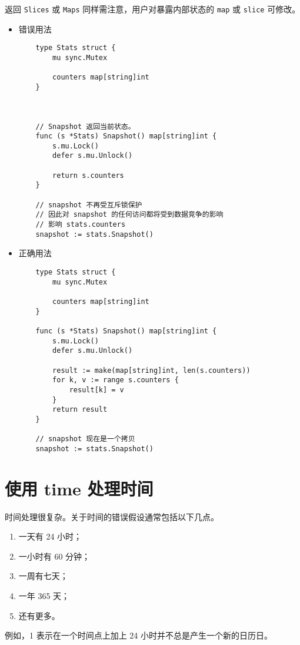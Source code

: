 返回 \texttt{Slices} 或 \texttt{Maps} 同样需注意，用户对暴露内部状态的 \texttt{map} 或 \texttt{slice} 可修改。
\begin{itemize}[leftmargin=4em]
\item 错误用法

  \begin{verbatim}
    type Stats struct {
    	mu sync.Mutex

    	counters map[string]int
    }



    // Snapshot 返回当前状态。
    func (s *Stats) Snapshot() map[string]int {
    	s.mu.Lock()
    	defer s.mu.Unlock()

    	return s.counters
    }

    // snapshot 不再受互斥锁保护
    // 因此对 snapshot 的任何访问都将受到数据竞争的影响
    // 影响 stats.counters
    snapshot := stats.Snapshot()
  \end{verbatim}
\item 正确用法

  \begin{verbatim}
    type Stats struct {
    	mu sync.Mutex

    	counters map[string]int
    }

    func (s *Stats) Snapshot() map[string]int {
    	s.mu.Lock()
    	defer s.mu.Unlock()

    	result := make(map[string]int, len(s.counters))
    	for k, v := range s.counters {
    		result[k] = v
    	}
    	return result
    }

    // snapshot 现在是一个拷贝
    snapshot := stats.Snapshot()
  \end{verbatim}
\end{itemize}

\section{使用 time 处理时间}
时间处理很复杂。关于时间的错误假设通常包括以下几点。
\begin{enumerate}[leftmargin=4em]
\item 一天有 24 小时；
\item 一小时有 60 分钟；
\item 一周有七天；
\item 一年 365 天；
\item 还有更多。
\end{enumerate}

例如，1 表示在一个时间点上加上 24 小时并不总是产生一个新的日历日。

